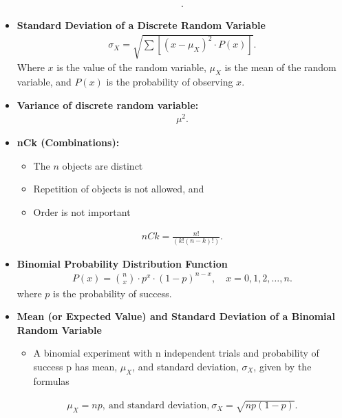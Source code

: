\documentclass{report}
\begin{document}
\begin{itemize}
\begin{align*}
            .\end{align*}
        \item \textbf{Standard Deviation of a Discrete Random Variable}
            \begin{align*}
                \sigma_X = \sqrt{\sum [(x - \mu_X)^2 \cdot P(x)]}
            .\end{align*}
        Where $x$ is the value of the random variable, $\mu_X$ is the mean of the random variable, and $P(x)$ is the probability of observing $x$.
        \item \textbf{Variance of discrete random variable:}
            \begin{align*}
                \mu^{2}
            .\end{align*}
          \item \textbf{nCk (Combinations):}
              \begin{itemize}
                  \item The  $n$  objects are distinct
                  \item Repetition of objects is not allowed, and
                  \item Order is not important
              \end{itemize}
              \begin{align*}
                  nCk = \frac{n!}{(k!(n-k)!)}
              .\end{align*}
            \item \textbf{Binomial Probability Distribution Function}
                \begin{align*}
                    P(x) = \binom{n}{x} \cdot p^x \cdot (1 - p)^{n-x}, \quad x = 0, 1, 2, \ldots, n
                .\end{align*}
                where $p$ is the probability of success.
            \item \textbf{Mean (or Expected Value) and Standard Deviation of a Binomial Random Variable}
                \begin{itemize}
                    \item A binomial experiment with n independent trials and probability of success p has mean, $\mu_X$, and standard deviation, $\sigma_X$, given by the formulas
                \end{itemize}
                \begin{align*}
                    \mu_X = np,\ \text{and standard deviation,}\ \sigma_X = \sqrt{np(1-p)}
                .\end{align*}

\end{itemize}
\end{document}
